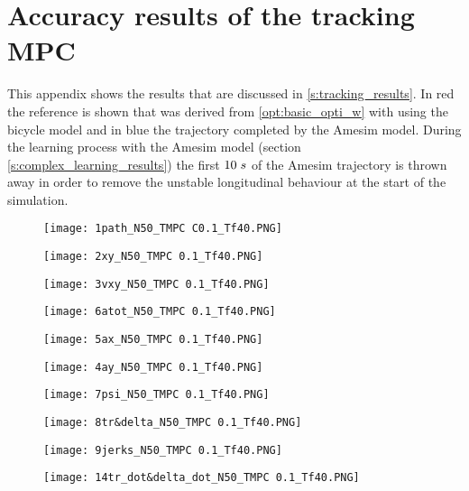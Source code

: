 \chapter{Accuracy results of the tracking MPC}
\label{app:D}
This appendix shows the results that are discussed in \ref{s:tracking_results}. In red the reference is shown that was derived from \ref{opt:basic_opti_w} with using the bicycle model and in blue the trajectory completed by the Amesim model. During the learning process with the Amesim model (section \ref{s:complex_learning_results}) the first $10 \hspace{1mm}s$ of the Amesim trajectory is thrown away in order to remove the unstable longitudinal behaviour at the start of the simulation.


\begin{figure}[h!]
	\centering
	\texttt{[image: 1path\_N50\_TMPC C0.1\_Tf40.PNG]}
\end{figure}

\begin{figure}[h!]
	\centering
	\texttt{[image: 2xy\_N50\_TMPC 0.1\_Tf40.PNG]}
\end{figure}

\begin{figure}[h!]
	\centering
	\texttt{[image: 3vxy\_N50\_TMPC 0.1\_Tf40.PNG]}
\end{figure}


\begin{figure}[h!]
	\centering
	\texttt{[image: 6atot\_N50\_TMPC 0.1\_Tf40.PNG]}
\end{figure}


\begin{figure}[h!]
	\centering
	\texttt{[image: 5ax\_N50\_TMPC 0.1\_Tf40.PNG]}
\end{figure}

\begin{figure}[h!]
	\centering
	\texttt{[image: 4ay\_N50\_TMPC 0.1\_Tf40.PNG]}
\end{figure}

\begin{figure}[h!]
	\centering
	\texttt{[image: 7psi\_N50\_TMPC 0.1\_Tf40.PNG]}
\end{figure}

\begin{figure}[h!]
	\centering
	\texttt{[image: 8tr\&delta\_N50\_TMPC 0.1\_Tf40.PNG]}
\end{figure}

\begin{figure}[h!]
	\centering
	\texttt{[image: 9jerks\_N50\_TMPC 0.1\_Tf40.PNG]}
\end{figure}

\begin{figure}[h!]
	\centering
	\texttt{[image: 14tr\_dot\&delta\_dot\_N50\_TMPC 0.1\_Tf40.PNG]}
\end{figure}





